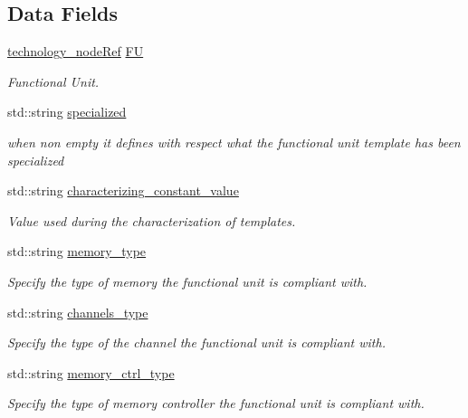 \subsection*{Data Fields}
\begin{DoxyCompactItemize}
\item 
\hyperlink{technology__node_8hpp_a33dd193b7bd6b987bf0d8a770a819fa7}{technology\+\_\+node\+Ref} \hyperlink{structfunctional__unit__template_ac2c180f41cde737cf1d25137f826ffed}{FU}
\begin{DoxyCompactList}\small\item\em Functional Unit. \end{DoxyCompactList}\item 
std\+::string \hyperlink{structfunctional__unit__template_a9e15a301255ffcb69fb3ac2f519c6fb4}{specialized}
\begin{DoxyCompactList}\small\item\em when non empty it defines with respect what the functional unit template has been specialized \end{DoxyCompactList}\item 
std\+::string \hyperlink{structfunctional__unit__template_a3dc55a57aa46776213c0ef8d4ad777dc}{characterizing\+\_\+constant\+\_\+value}
\begin{DoxyCompactList}\small\item\em Value used during the characterization of templates. \end{DoxyCompactList}\item 
std\+::string \hyperlink{structfunctional__unit__template_ab3660a5fa2b6f9fa95f905211f3a9617}{memory\+\_\+type}
\begin{DoxyCompactList}\small\item\em Specify the type of memory the functional unit is compliant with. \end{DoxyCompactList}\item 
std\+::string \hyperlink{structfunctional__unit__template_a4dee53a7a7f1a176381561806cbc50d9}{channels\+\_\+type}
\begin{DoxyCompactList}\small\item\em Specify the type of the channel the functional unit is compliant with. \end{DoxyCompactList}\item 
std\+::string \hyperlink{structfunctional__unit__template_a9a5def963728fa040c975edf41fca33d}{memory\+\_\+ctrl\+\_\+type}
\begin{DoxyCompactList}\small\item\em Specify the type of memory controller the functional unit is compliant with. \end{DoxyCompactList}\item 

\end{DoxyCompactItemize}
